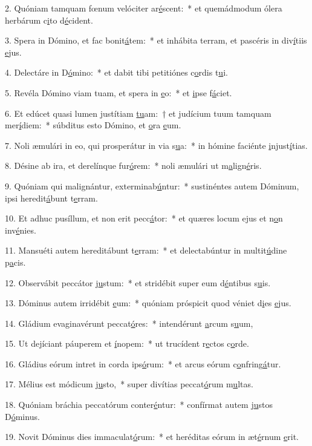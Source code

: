 2. Quóniam tamquam fœnum velóciter ar\uline{é}scent:~* et quemádmodum ólera herbárum c\uline{i}to d\uline{é}cident.\par 
3. Spera in Dómino, et fac bonit\uline{á}tem:~* et inhábita terram, et pascéris in div\uline{í}tiis \uline{e}jus.\par 
4. Delectáre in D\uline{ó}mino:~* et dabit tibi petitiónes c\uline{o}rdis t\uline{u}i.\par 
5. Revéla Dómino viam tuam, et spera in \uline{e}o:~* et \uline{i}pse f\uline{á}ciet.\par 
6. Et edúcet quasi lumen justítiam \uline{tu}am:~† et judícium tuum tamquam mer\uline{í}diem:~* súbditus esto Dómino, et \uline{o}ra \uline{e}um.\par 
7. Noli æmulári in eo, qui prosperátur in via s\uline{u}a:~* in hómine faciénte \uline{i}njust\uline{í}tias.\par 
8. Désine ab ira, et derelínque fur\uline{ó}rem:~* noli æmulári ut m\uline{a}lign\uline{é}ris.\par 
9. Quóniam qui malignántur, exterminab\uline{ú}ntur:~* sustinéntes autem Dóminum, ipsi heredit\uline{á}bunt t\uline{e}rram.\par 
10. Et adhuc pusíllum, et non erit pecc\uline{á}tor:~* et quæres locum ejus et n\uline{o}n inv\uline{é}nies.\par 
11. Mansuéti autem hereditábunt t\uline{e}rram:~* et delectabúntur in multit\uline{ú}dine p\uline{a}cis.\par 
12. Observábit peccátor j\uline{u}stum:~* et stridébit super eum d\uline{é}ntibus s\uline{u}is.\par 
13. Dóminus autem irridébit \uline{e}um:~* quóniam próspicit quod véniet d\uline{i}es \uline{e}jus.\par 
14. Gládium evaginavérunt peccat\uline{ó}res:~* intendérunt \uline{a}rcum s\uline{u}um,\par 
15. Ut dejíciant páuperem et \uline{í}nopem:~* ut trucídent r\uline{e}ctos c\uline{o}rde.\par 
16. Gládius eórum intret in corda ips\uline{ó}rum:~* et arcus eórum c\uline{o}nfring\uline{á}tur.\par 
17. Mélius est módicum j\uline{u}sto,~* super divítias peccat\uline{ó}rum m\uline{u}ltas.\par 
18. Quóniam bráchia peccatórum conter\uline{é}ntur:~* confírmat autem j\uline{u}stos D\uline{ó}minus.\par 
19. Novit Dóminus dies immaculat\uline{ó}rum:~* et heréditas eórum in æt\uline{é}rnum \uline{e}rit.\par 
